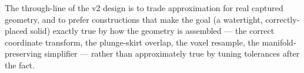 \documentclass[11pt]{article}
\begin{document}
The through-line of the v2 design is to trade approximation for real captured geometry, and to
prefer constructions that make the goal (a watertight, correctly-placed solid) exactly true by
how the geometry is assembled --- the correct coordinate transform, the plunge-skirt overlap,
the voxel resample, the manifold-preserving simplifier --- rather than approximately true by
tuning tolerances after the fact.
\end{document}
